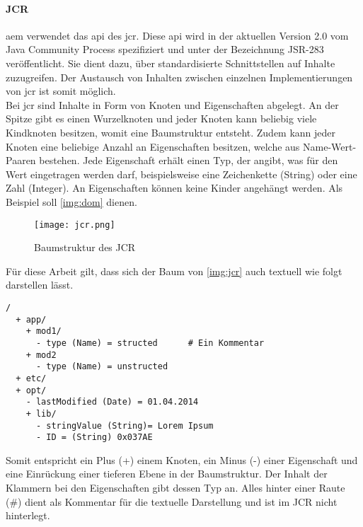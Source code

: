 \paragraph{JCR}
\ac{aem} verwendet das \ac{api} des \ac{jcr}. Diese \ac{api} wird in der aktuellen Version 2.0 vom Java Community Process spezifiziert und unter der Bezeichnung JSR-283 veröffentlicht. Sie dient dazu, über standardisierte Schnittstellen auf Inhalte zuzugreifen. Der Austausch von Inhalten zwischen einzelnen Implementierungen von \ac{jcr} ist somit möglich. \\
Bei \ac{jcr} sind Inhalte in Form von Knoten und Eigenschaften abgelegt. An der Spitze gibt es einen Wurzelknoten und jeder Knoten kann beliebig viele Kindknoten besitzen, womit eine Baumstruktur entsteht. Zudem kann jeder Knoten eine beliebige Anzahl an Eigenschaften besitzen, welche aus Name-Wert-Paaren bestehen. Jede Eigenschaft erhält einen Typ, der angibt, was für den Wert eingetragen werden darf, beispielsweise eine Zeichenkette (String) oder eine Zahl (Integer). An Eigenschaften können keine Kinder angehängt werden. Als Beispiel soll \autoref{img:dom} dienen.

\begin{figure}[H]
	\begin{center}
		\texttt{[image: jcr.png]}
		\caption{Baumstruktur des JCR}
		\label{img:jcr}
	\end{center}
\end{figure}


Für diese Arbeit gilt, dass sich der Baum von \autoref{img:jcr} auch textuell wie folgt darstellen lässt.

\begin{minipage}{\textwidth}
\begin{lstlisting}[style=jcr, caption=Textuelle Darstellung von JCR, label=lst:jcr]
/
  + app/
    + mod1/
      - type (Name) = structed		# Ein Kommentar
    + mod2
	  - type (Name) = unstructed
  + etc/
  + opt/
    - lastModified (Date) = 01.04.2014
    + lib/
      - stringValue (String)= Lorem Ipsum
      - ID = (String) 0x037AE
\end{lstlisting}
\end{minipage}

Somit entspricht ein Plus (+) einem Knoten, ein Minus (-) einer Eigenschaft und eine Einrückung einer tieferen Ebene in der Baumstruktur. Der Inhalt der Klammern bei den Eigenschaften gibt dessen Typ an. Alles hinter einer Raute (\#) dient als Kommentar für die textuelle Darstellung und ist im JCR nicht hinterlegt.